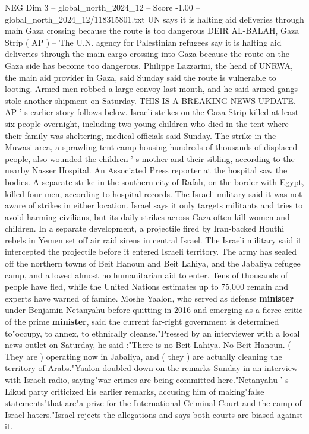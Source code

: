 \begin{textsample}{NEG Dim 3 – global\_north\_2024\_12 – Score -1.00 – global\_north\_2024\_12/118315801.txt}  \label{ex:f3_neg_229}
UN says it is halting aid deliveries through main Gaza crossing because the route is too dangerous DEIR AL-BALAH, Gaza Strip ( AP ) -- The U.N. agency for Palestinian refugees say it is halting aid deliveries through the main cargo crossing into Gaza because the route on the Gaza side has become too dangerous.
Philippe Lazzarini, the head of UNRWA, the main aid provider in Gaza, said Sunday said the route is vulnerable to looting.
Armed men robbed a large convoy last month, and he said armed gangs stole another shipment on Saturday.
THIS IS A BREAKING NEWS UPDATE.
AP ' s earlier story follows below.
Israeli strikes on the Gaza Strip killed at least six people overnight, including two young children who died in the tent where their family was sheltering, medical officials said Sunday.
The strike in the Muwasi area, a sprawling tent camp housing hundreds of thousands of displaced people, also wounded the children ' s mother and their sibling, according to the nearby Nasser Hospital.
An Associated Press reporter at the hospital saw the bodies.
A separate strike in the southern city of Rafah, on the border with Egypt, killed four men, according to hospital records.
The Israeli military said it was not aware of strikes in either location.
Israel says it only targets militants and tries to avoid harming civilians, but its daily strikes across Gaza often kill women and children.
In a separate development, a projectile fired by Iran-backed Houthi rebels in Yemen set off air raid sirens in central Israel.
The Israeli military said it intercepted the projectile before it entered Israeli territory.
The army has sealed off the northern towns of Beit Hanoun and Beit Lahiya, and the Jabaliya refugee camp, and allowed almost no humanitarian aid to enter.
Tens of thousands of people have fled, while the United Nations estimates up to 75,000 remain and experts have warned of famine.
Moshe Yaalon, who served as defense \textbf{minister} under Benjamin Netanyahu before quitting in 2016 and emerging as a fierce critic of the prime \textbf{minister}, said the current far-right government is determined to"occupy, to annex, to ethnically cleanse."Pressed by an interviewer with a local news outlet on Saturday, he said :"There is no Beit Lahiya.
No Beit Hanoun. ( They are ) operating now in Jabaliya, and ( they ) are actually cleaning the territory of Arabs."Yaalon doubled down on the remarks Sunday in an interview with Israeli radio, saying"war crimes are being committed here."Netanyahu ' s Likud party criticized his earlier remarks, accusing him of making"false statements"that are"a prize for the International Criminal Court and the camp of Israel haters."Israel rejects the allegations and says both courts are biased against it.

\end{textsample}
